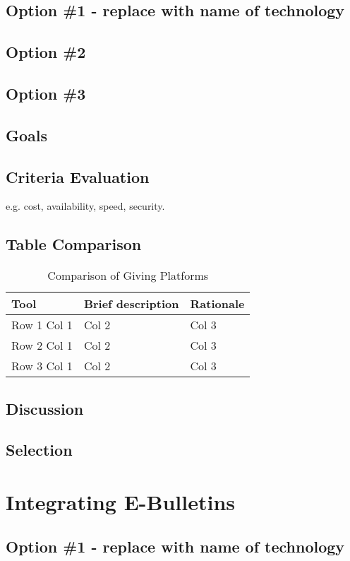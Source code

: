 \documentclass[letterpaper,10pt,draftclsnofoot,onecolumn,titlepage]{IEEEtran}
\begin{document}
	\subsection{Option \#1 - replace with name of technology}
	\subsection{Option \#2}
	\subsection{Option \#3}
	\subsection{Goals}
	\subsection{Criteria Evaluation}
	e.g. cost, availability, speed, security.
	\subsection{Table Comparison}
	\begin{table}[ht]
	\caption{Comparison of Giving Platforms}
	\begin{center}
	\begin{tabular} { | m{3cm} | m{5cm} | m{5cm} | }
	\hline\hline
	Tool & Brief description & Rationale \\ [0.5ex]
	\hline
	Row 1 Col 1 & Col 2 & Col 3 \\
	\hline
	Row 2 Col 1 & Col 2 & Col 3 \\
	\hline
	Row 3 Col 1 & Col 2 & Col 3 \\
	\hline
	\end{tabular}
	\end{center}
	\end{table}
	\subsection{Discussion}
	\subsection{Selection}

	\section{Integrating E-Bulletins}
	\subsection{Option \#1 - replace with name of technology}
\end{document}
